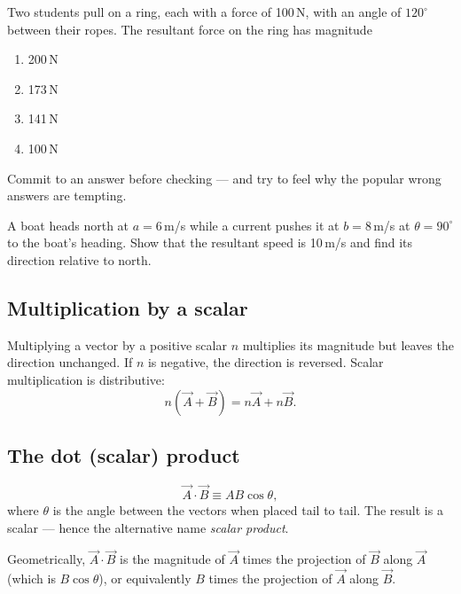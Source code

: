 \begin{checkpoint}
Two students pull on a ring, each with a force of 100\,N, with an angle of
$120^\circ$ between their ropes. The resultant force on the ring has magnitude
\begin{enumerate}[label=(\alph*), leftmargin=2.5em, itemsep=0pt]
  \item 200\,N
  \item 173\,N
  \item 141\,N
  \item 100\,N
\end{enumerate}
Commit to an answer before checking --- and try to feel why the popular wrong
answers are tempting.
\end{checkpoint}

\begin{tryit}
A boat heads north at $a=6$\,m/s while a current pushes it at $b=8$\,m/s at $\theta=90^\circ$
to the boat's heading. Show that the resultant speed is 10\,m/s and find its direction
relative to north.
\end{tryit}

\subsection{Multiplication by a scalar}
Multiplying a vector by a positive scalar $n$ multiplies its magnitude but leaves the direction
unchanged. If $n$ is negative, the direction is reversed. Scalar multiplication is distributive:
\[
  n(\vec{A}+\vec{B}) = n\vec{A}+n\vec{B}.
\]

\subsection{The dot (scalar) product}

\begin{keybox}
\[
  \vec{A}\cdot\vec{B} \equiv AB\cos\theta,
\]
where $\theta$ is the angle between the vectors when placed tail to tail. The result is a
scalar --- hence the alternative name \emph{scalar product}.
\end{keybox}

Geometrically, $\vec{A}\cdot\vec{B}$ is the magnitude of $\vec{A}$ times the projection of $\vec{B}$
along $\vec{A}$ (which is $B\cos\theta$), or equivalently $B$ times the projection of $\vec{A}$ along $\vec{B}$.

